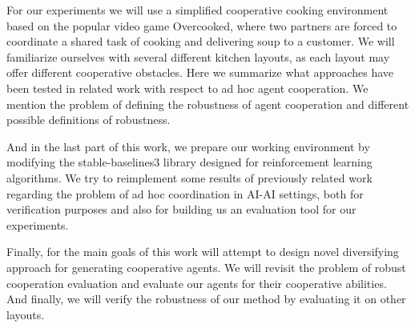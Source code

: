 For our experiments we will use a simplified cooperative cooking environment based on the popular video game Overcooked, where two partners are forced to coordinate a shared task of cooking and delivering soup to a customer.
We will familiarize ourselves with several different kitchen layouts, as each layout may offer different cooperative obstacles.
Here we summarize what approaches have been tested in related work with respect to ad hoc agent cooperation.
We mention the problem of defining the robustness of agent cooperation and different possible definitions of robustness.

And in the last part of this work, we prepare our working environment by modifying the stable-baselines3 library designed for reinforcement learning algorithms.
We try to reimplement some results of previously related work regarding the problem of ad hoc coordination in AI-AI settings, both for verification purposes and also for building us an evaluation tool for our experiments.

Finally, for the main goals of this work will attempt to design novel diversifying approach for generating cooperative agents.
We will revisit the problem of robust cooperation evaluation and evaluate our agents for their cooperative abilities.
And finally, we will verify the robustness of our method by evaluating it on other layouts.

